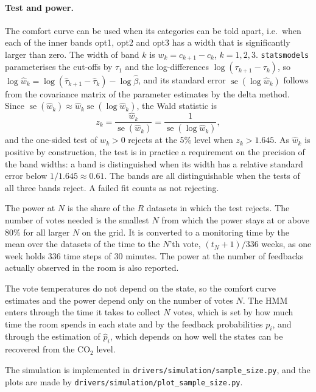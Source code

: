 \paragraph{Test and power.}
The comfort curve can be used when its categories can be told apart, i.e.\
when each of the inner bands opt1, opt2 and opt3 has a width that is
significantly larger than zero. The width of band $k$ is
$w_k = c_{k+1} - c_k$, $k = 1, 2, 3$. \texttt{statsmodels} parameterises the
cut-offs by $\tau_1$ and the log-differences $\log(\tau_{k+1} - \tau_k)$, so
$\log \hat{w}_k = \log(\hat{\tau}_{k+1} - \hat{\tau}_k) - \log \hat{\beta}$, and
its standard error $\operatorname{se}(\log \hat{w}_k)$ follows from the
covariance matrix of the parameter estimates by the delta method. Since
$\operatorname{se}(\hat{w}_k) \approx \hat{w}_k \operatorname{se}(\log \hat{w}_k)$,
the Wald statistic is
\begin{equation}
    z_k = \frac{\hat{w}_k}{\operatorname{se}(\hat{w}_k)} = \frac{1}{\operatorname{se}(\log \hat{w}_k)},
\end{equation}
and the one-sided test of $w_k > 0$ rejects at the 5\% level when
$z_k > 1.645$. As $\hat{w}_k$ is positive by construction, the test is in
practice a requirement on the precision of the band widths: a band is
distinguished when its width has a relative standard error below
$1/1.645 \approx 0.61$. The bands are all distinguishable when the tests of
all three bands reject. A failed fit counts as not rejecting.

The power at $N$ is the share of the $R$ datasets in which the test rejects.
The number of votes needed is the smallest $N$ from which the power stays at
or above 80\% for all larger $N$ on the grid. It is converted to a monitoring
time by the mean over the datasets of the time to the $N$'th vote,
$(t_N + 1)/336$ weeks, as one week holds 336 time steps of 30 minutes. The
power at the number of feedbacks actually observed in the room is also
reported.

The vote temperatures do not depend on the state, so the comfort curve
estimates and the power depend only on the number of votes $N$. The HMM enters
through the time it takes to collect $N$ votes, which is set by how much time
the room spends in each state and by the feedback probabilities $p_i$, and
through the estimation of $\hat{p}_i$, which depends on how well the states can
be recovered from the $\text{CO}_2$ level.

The simulation is implemented in \texttt{drivers/simulation/sample\_size.py},
and the plots are made by \texttt{drivers/simulation/plot\_sample\_size.py}.

